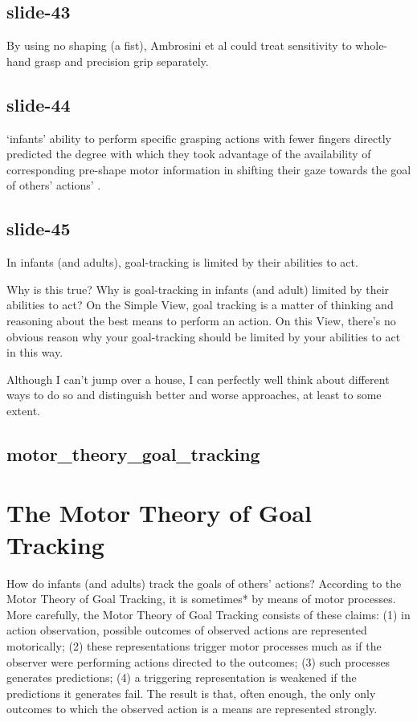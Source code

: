 \documentclass[12pt,\papersize]{extarticle}
\begin{document}
\subsection{slide-43}
By using no shaping (a fist), Ambrosini et al could treat sensitivity
to whole-hand grasp and precision grip separately.
 
\subsection{slide-44}
‘infants’ ability to perform specific grasping actions with fewer fingers directly predicted the degree with which they took advantage of the availability of corresponding pre-shape motor information in shifting their gaze towards the goal of others’ actions’ \citep[p.~6]{ambrosini:2013_looking}.
 
\subsection{slide-45}
In infants (and adults), 
goal-tracking is limited by their abilities to act.
 
Why is this true?
Why is goal-tracking in infants (and adult) limited by their abilities to act?
On the Simple View, goal tracking is a matter of thinking and reasoning about the 
best means to perform an action. 
On this View, there’s no obvious reason why 
your goal-tracking should be limited by your abilities to act in this way.
 
Although I can’t jump over a house, I can perfectly well think about different ways
to do so and distinguish better and worse approaches, at least to some extent.
 
\subsection{motor\_theory\_goal\_tracking}
 
 
\section{The Motor Theory of Goal Tracking}
 
How do infants (and adults) track the goals of others’ actions?
According to the Motor Theory of Goal Tracking, it is sometimes* by 
means of motor processes.
More carefully, the Motor Theory of Goal Tracking consists of these claims: 
(1) in action observation, possible outcomes of observed actions are represented motorically;
(2) these representations trigger motor processes much as if the observer were performing actions
directed to the outcomes;
(3) such processes generates predictions;
(4) a triggering representation is weakened if the predictions it generates fail.
The result is that, often enough, the only only outcomes to which the observed action is a means
are represented strongly.
\end{document}
